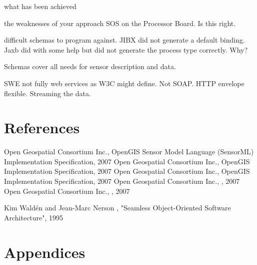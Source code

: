 \documentclass[]{final_report}
\begin{document}
what has been achieved

the weaknesses of your approach
SOS on the Processor Board. Is this right.

difficult schemas to program against.
JIBX did not generate a default binding.
Jaxb did with some help but did not generate the process type correctly.
Why?

Schemas cover all needs for sensor description and data.

SWE not fully web services as W3C might define. Not SOAP. HTTP envelope
flexible.
Streaming the data.

\chapter{References}
\newpage
\begin{thebibliography}{99}
Open Geospatial Consortium Inc., OpenGIS Sensor Model Language (SensorML) Implementation Specification, 2007
Open Geospatial Consortium Inc., OpenGIS  Implementation Specification, 2007
Open Geospatial Consortium Inc., OpenGIS  Implementation Specification, 2007
Open Geospatial Consortium Inc., , 2007
Open Geospatial Consortium Inc., , 2007


Kim Waldén and Jean-Marc Nerson , "Seamless Object-Oriented Software Architecture", 1995
\end{thebibliography}
\label{endpage}


\chapter{Appendices}

\lstset{language=XML,basicstyle=\small}

\end{document}

